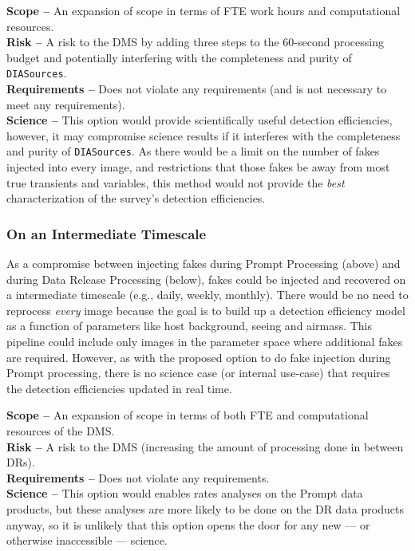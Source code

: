 \documentclass[DM,lsstdraft,toc]{lsstdoc}
\begin{document}
{\bf Scope --} An expansion of scope in terms of FTE work hours and computational resources. \\
{\bf Risk --} A risk to the DMS by adding three steps to the 60-second processing budget and potentially interfering with the completeness and purity of {\tt DIASources}. \\
{\bf Requirements --} Does not violate any requirements (and is not necessary to meet any requirements). \\
{\bf Science --} This option would provide scientifically useful detection efficiencies, however, it may compromise science results if it interferes with the completeness and purity of {\tt DIASources}. As there would be a limit on the number of fakes injected into every image, and restrictions that those fakes be away from most true transients and variables, this method would not provide the {\it best} characterization of the survey's detection efficiencies.

\subsubsection{On an Intermediate Timescale}\label{sssec:opts_fakeswhen_int}

As a compromise between injecting fakes during Prompt Processing (above) and during Data Release Processing (below), fakes could be injected and recovered on a intermediate timescale (e.g., daily, weekly, monthly). There would be no need to reprocess {\it every} image because the goal is to build up a detection efficiency model as a function of parameters like host background, seeing and airmass. This pipeline could include only images in the parameter space where additional fakes are required. However, as with the proposed option to do fake injection during Prompt processing, there is no science case (or internal use-case) that requires the detection efficiencies updated in real time.  

{\bf Scope --} An expansion of scope in terms of both FTE and computational resources of the DMS. \\
{\bf Risk --} A risk to the DMS (increasing the amount of processing done in between DRs). \\
{\bf Requirements --} Does not violate any requirements. \\
{\bf Science --} This option would enables rates analyses on the Prompt data products, but these analyses are more likely to be done on the DR data products anyway, so it is unlikely that this option opens the door for any new --- or otherwise inaccessible --- science. 
\end{document}
